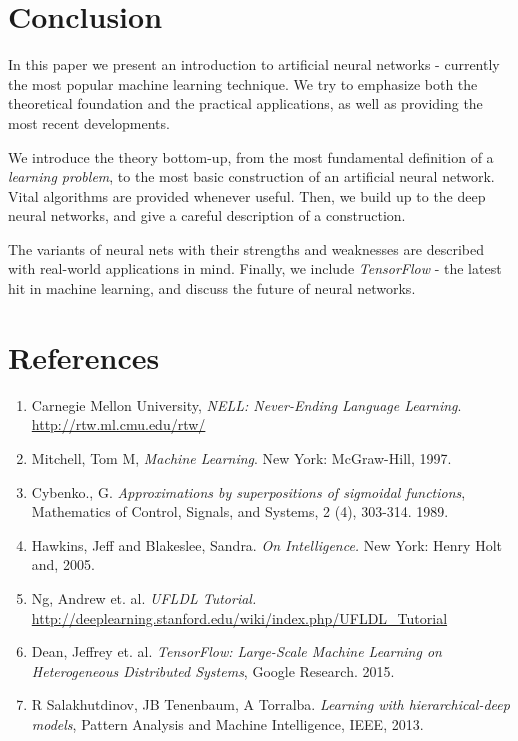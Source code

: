 \documentclass[12pt]{article}  %
\begin{document}
\section{Conclusion}

In this paper we present an introduction to artificial neural networks - currently the most popular machine learning technique. We try to emphasize both the theoretical foundation and the practical applications, as well as providing the most recent developments.

We introduce the theory bottom-up, from the most fundamental definition of a \emph{learning problem}, to the most basic construction of an artificial neural network. Vital algorithms are provided whenever useful. Then, we build up to the deep neural networks, and give a careful description of a construction.

The variants of neural nets with their strengths and weaknesses are described with real-world applications in mind. Finally, we include \emph{TensorFlow} - the latest hit in machine learning, and discuss the future of neural networks.





\section{References}


\begin{enumerate}

\item Carnegie Mellon University, \emph{NELL: Never-Ending Language Learning}. \url{http://rtw.ml.cmu.edu/rtw/}\label{NELL}

\item Mitchell, Tom M, \emph{Machine Learning}. New York: McGraw-Hill, 1997.\label{Mitchell}

\item Cybenko., G. \emph{Approximations by superpositions of sigmoidal functions}, Mathematics of Control, Signals, and Systems, 2 (4), 303-314. 1989. \label{Cybenko}

\item Hawkins, Jeff and Blakeslee, Sandra. \emph{On Intelligence.} New York: Henry Holt and, 2005. \label{Hawkins}

\item Ng, Andrew et. al. \emph{UFLDL Tutorial.} \url{http://deeplearning.stanford.edu/wiki/index.php/UFLDL_Tutorial}\label{UFLDL}

\item Dean, Jeffrey et. al. \emph{TensorFlow: Large-Scale Machine Learning on Heterogeneous Distributed Systems}, Google Research. 2015. \label{tensorflow_paper}

\item R Salakhutdinov, JB Tenenbaum, A Torralba. \emph{Learning with hierarchical-deep models}, Pattern Analysis and Machine Intelligence, IEEE, 2013. \label{hierarchical}


\end{enumerate}
\end{document}
